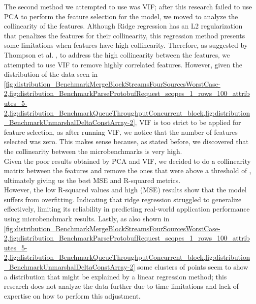 The second method we attempted to use was \ac{VIF}; after this research failed to use \ac{PCA} to perform the feature selection for the model, we moved to analyze the collinearity of the features. Although Ridge regression has an L2 regularization that penalizes the features for their collinearity, this regression method presents some limitations when features have high collinearity. Therefore, as suggested by Thompson et al. \cite{thompson2017extractingVIF}, to address the high collinearity between the features, we attempted to use \ac{VIF} to remove highly correlated features. However, given the distribution of the data seen in \cref{fig:distribution_BenchmarkMergeBlockStreamsFourSourcesWorstCase-2,fig:distribution_BenchmarkParseProtobufRequest_scopes_1_rows_100_attributes_5-2,fig:distribution_BenchmarkQueueThroughputConcurrent_block,fig:distribution_BenchmarkUnmarshalDeltaConstArray-2}, \ac{VIF} is too strict to be applied for feature selection, as after running \ac{VIF}, we notice that the number of features selected was zero. This makes sense because, as stated before, we discovered that the collinearity between the microbenchmarks is very high.  \\
Given the poor results obtained by \ac{PCA} and \ac{VIF}, we decided to do a collinearity matrix between the features and remove the ones that were above a threshold of , ultimately giving us the best \ac{MSE} and R-squared metrics. \\
However, the low R-squared values and high (\ac{MSE}) results show that the model suffers from overfitting. Indicating that ridge regression struggled to generalize effectively, limiting its reliability in predicting real-world application performance using microbenchmark results. Lastly, as also shown in \cref{fig:distribution_BenchmarkMergeBlockStreamsFourSourcesWorstCase-2,fig:distribution_BenchmarkParseProtobufRequest_scopes_1_rows_100_attributes_5-2,fig:distribution_BenchmarkQueueThroughputConcurrent_block,fig:distribution_BenchmarkUnmarshalDeltaConstArray-2} some clusters of points seem to show a distribution that might be explained by a linear regression method; this research does not analyze the data further due to time limitations and lack of expertise on how to perform this adjustment.  \\
